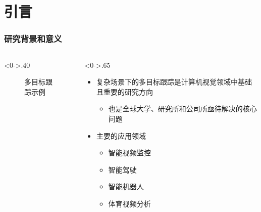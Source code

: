 \section{引言}  %


\begin{frame}
	\frametitle{研究背景和意义}
	\begin{columns}[T] %
		\begin{column}<0->{.40\textwidth}
			\begin{figure}[thpb]
				\centering
				\caption{多目标跟踪示例}
				\label{fig:campus}
			\end{figure}
		\end{column}
		\hfill%
		\begin{column}<0->{.65\textwidth}
			\begin{itemize}
				\item<1-> 复杂场景下的多目标跟踪是计算机视觉领域中基础且重要的研究方向
				\begin{itemize}
					\item<1-> 也是全球大学、研究所和公司所亟待解决的核心问题
				\end{itemize}
				\item<1-> 主要的应用领域
				\begin{itemize}
					\item<1-> 智能视频监控
					\item<1-> 智能驾驶
					\item<1-> 智能机器人
					\item<1-> 体育视频分析
				\end{itemize}
			\end{itemize}
		\end{column}%
	\end{columns}
\end{frame}


